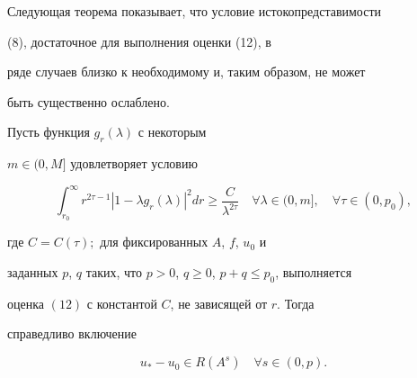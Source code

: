  


Следующая теорема показывает, что условие истокопредставимости 


(8), достаточное для выполнения оценки (12), в 


ряде случаев близко к необходимому и, таким образом, не может 


быть существенно ослаблено. 


 


\begin{thm} 


Пусть функция $g_r(\lambda)$ с некоторым 


$m\in(0,M]$ удовлетворяет условию 


\begin{equation} 


\int^\infty_{r_0}r^{2\tau-1}|1-\lambda g_r(\lambda)|^2 


d r\ge\frac{C}{\lambda^{2\tau}}\quad 


\forall\lambda\in(0,m],\quad \forall\tau\in(0,p_0), 


\end{equation} 


где $C=C(\tau);$ для фиксированных $A$, $f$, $u_0$ и 


заданных $p$, $q$ таких, что $p>0$, $q\ge0$, $p+q\le p_0$, выполняется 


оценка $(12)$ с константой $C$, не зависящей от $r$. Тогда 


справедливо включение 


\begin{equation} 


u_*-u_0\in R(A^s)\quad \forall s\in(0,p). 


\end{equation} 


\end{thm} 


 


